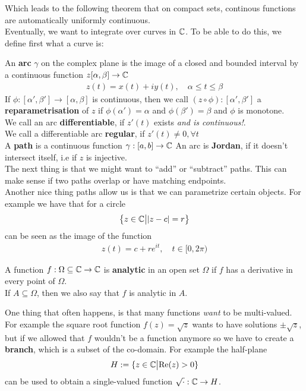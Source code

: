 Which leads to the following theorem that on compact sets, continous functions are automatically uniformly continuous.\\


Eventually, we want to integrate over curves in $\mathbb{C}$. To be able to do this, we define first what a curve is:

An \textbf{arc} $\gamma$ on the complex plane is the image of a closed and bounded interval by a continuous function $z [\alpha, \beta] \to \mathbb{C}$
\begin{align*}
	z(t) = x(t) + iy(t), \quad \alpha \leq t \leq \beta
\end{align*}
If $\phi: [\alpha', \beta'] \to [\alpha, \beta]$ is continuous, then we call $(z \circ \phi): [\alpha', \beta']$ a \textbf{reparametrisation} of $z$ if $\phi(\alpha') = \alpha$ and $\phi(\beta') = \beta$ and $\phi$ is monotone.\\
We call an arc \textbf{differentiable}, if $z'(t)$ exists \emph{and is continuous!}.\\
We call a differentiable arc \textbf{regular}, if $z'(t) \neq 0, \forall t$\\
A \textbf{path} is a continuous function $\gamma: [a,b] \to \mathbb{C}$
An arc is \textbf{Jordan}, if it doesn't intersect itself, i.e if $z$ is injective.\\

The next thing is that we might want to ``add'' or ``subtract'' paths. This can make sense if two paths overlap or have matching endpoints.\\

Another nice thing paths allow us is that we can parametrize certain objects. For example we have that for a circle
\begin{align*}
	\left\{z \in \mathbb{C} \big\vert \vert z - c\vert = r\right\}
\end{align*}
can be seen as the image of the function
\begin{align*}
	z(t) = c + re^{it}, \quad t \in [0, 2\pi)
\end{align*}

\begin{definition}[]
	A function $f: \Omega \subseteq \mathbb{C} \to \mathbb{C}$ is \textbf{analytic} in an open set $\Omega$ if $f$ has a derivative in every point of $\Omega$. \\
	If $A \subseteq \Omega$, then we also say that $f$ is analytic in $A$.
\end{definition}

One thing that often happens, is that many functions \emph{want} to be multi-valued. For example the square root function $f(z) = \sqrt{z}$ wants to have solutions $\pm \sqrt{z}$, but if we allowed that $f$ wouldn't be a function anymore so we have to create a \textbf{branch}, which is a subset of the co-domain. For example the half-plane 
\begin{align*}
	H:= \{z \in \mathbb{C} \big\vert \text{Re}(z) > 0\} 
\end{align*}
can be used to obtain a single-valued function $\sqrt{\cdot}: \mathbb{C} \to H$.

